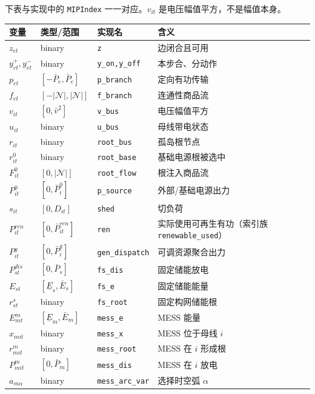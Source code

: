 下表与实现中的 \texttt{MIPIndex} 一一对应。$v_{it}$ 是电压幅值平方，不是幅值本身。
\begin{center}\small
\begin{longtable}{@{}L{2.2cm}L{3.1cm}L{2.4cm}L{6.2cm}@{}}
\toprule
变量 & 类型/范围 & 实现名 & 含义\\\midrule\endhead
$z_{et}$ & binary & \texttt{z} & 边闭合且可用\\
$y^+_{et},y^-_{et}$ & binary & \texttt{y\_on,y\_off} & 本步合、分动作\\
$p_{et}$ & $[-\bar P_e,\bar P_e]$ & \texttt{p\_branch} & 定向有功传输\\
$f_{et}$ & $[-|\mathcal N|,|\mathcal N|]$ & \texttt{f\_branch} & 连通性商品流\\
$v_{it}$ & $[0,\bar v^2]$ & \texttt{v\_bus} & 电压幅值平方\\
$u_{it}$ & binary & \texttt{u\_bus} & 母线带电状态\\
$r_{it}$ & binary & \texttt{root\_bus} & 孤岛根节点\\
$r^0_{it}$ & binary & \texttt{root\_base} & 基础电源根被选中\\
$F^0_{it}$ & $[0,|\mathcal N|]$ & \texttt{root\_flow} & 根注入商品流\\
$P^0_{it}$ & $[0,\bar P^0_i]$ & \texttt{p\_source} & 外部/基础电源出力\\
$s_{it}$ & $[0,D_{it}]$ & \texttt{shed} & 切负荷\\
$P^{ren}_{it}$ & $[0,\bar P^{ren}_{it}]$ & \texttt{ren} & 实际使用可再生有功（索引族 \texttt{renewable\_used}）\\
$P^g_{it}$ & $[0,\bar P^g_i]$ & \texttt{gen\_dispatch} & 可调资源聚合出力\\
$P^{dis}_{st}$ & $[0,\bar P_s]$ & \texttt{fs\_dis} & 固定储能放电\\
$E_{st}$ & $[\underline E_s,\bar E_s]$ & \texttt{fs\_e} & 固定储能能量\\
$r^s_{st}$ & binary & \texttt{fs\_root} & 固定构网储能根\\
$E^m_{mt}$ & $[\underline E_m,\bar E_m]$ & \texttt{mess\_e} & MESS 能量\\
$x_{mit}$ & binary & \texttt{mess\_x} & MESS 位于母线 $i$\\
$r^m_{mit}$ & binary & \texttt{mess\_root} & MESS 在 $i$ 形成根\\
$P^m_{mit}$ & $[0,\bar P_m]$ & \texttt{mess\_dis} & MESS 在 $i$ 放电\\
$a_{m\alpha}$ & binary & \texttt{mess\_arc\_var} & 选择时空弧 $\alpha$\\
\bottomrule
\end{longtable}
\end{center}

